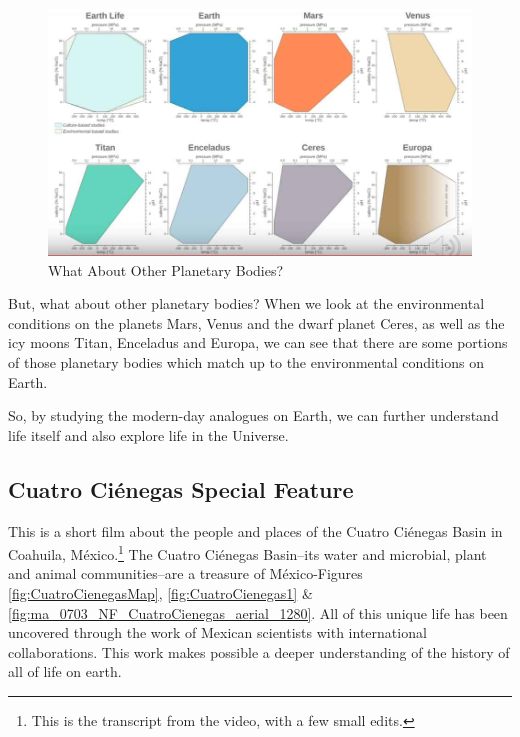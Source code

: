 \documentclass[]{article}
\begin{document}
\begin{figure}[H]
	\caption{What About Other Planetary Bodies?}\label{fig:WhatAboutOtherPlanetaryBodies}
	\includegraphics[width=\textwidth]{WhatAboutOtherPlanetaryBodies}
\end{figure}
But, what about other planetary bodies?
When we look at
the environmental conditions
on the planets Mars, Venus
and the dwarf planet Ceres,
as well as the icy moons Titan,
Enceladus and Europa,
we can see that there are some portions
of those planetary bodies
which match up to the environmental
conditions on Earth.

So, by studying the modern-day analogues
on Earth,
we can further understand life itself
and also explore life in the Universe.


\subsection{Cuatro Ci\'enegas Special Feature}

This is a short film about the people and places of the Cuatro Ci\'enegas Basin in Coahuila, M\'exico.\footnote{This is the transcript from the video, with a few small edits.} The Cuatro Ci\'enegas Basin--its water and microbial, plant and animal communities--are a treasure of M\'exico-Figures \ref{fig:CuatroCienegasMap}, \ref{fig:CuatroCienegas1} \& \ref{fig:ma_0703_NF_CuatroCienegas_aerial_1280}. All of this unique life has been uncovered through the work of Mexican scientists with international collaborations. This work makes possible a deeper understanding of the history of all of life on earth.
\end{document}
